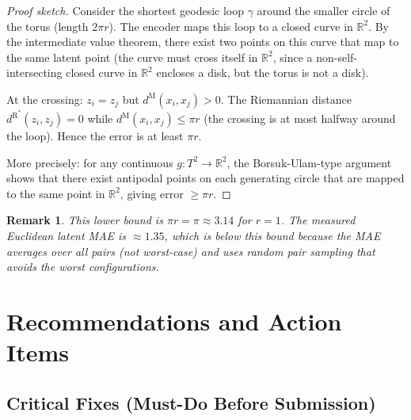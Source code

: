 \documentclass{article}
\newtheorem{remark}{Remark}
\newcommand{\dR}{d^{\mathrm{R}}}
\newcommand{\dM}{d^{\mathrm{M}}}
\newcommand{\RR}{\mathbb{R}}
\begin{document}
\begin{proof}[Proof sketch]
Consider the shortest geodesic loop $\gamma$ around the smaller circle of the
torus (length $2\pi r$). The encoder maps this loop to a closed curve in
$\RR^2$. By the intermediate value theorem, there exist two points on this
curve that map to the same latent point (the curve must cross itself in
$\RR^2$, since a non-self-intersecting closed curve in $\RR^2$ encloses a
disk, but the torus is not a disk).

At the crossing: $z_i = z_j$ but $\dM(x_i, x_j) > 0$. The Riemannian
distance $\dR^*(z_i, z_j) = 0$ while $\dM(x_i, x_j) \leq \pi r$ (the
crossing is at most halfway around the loop). Hence the error is at least
$\pi r$.

More precisely: for any continuous $g: T^2 \to \RR^2$, the Borsuk-Ulam-type
argument shows that there exist antipodal points on each generating circle
that are mapped to the same point in $\RR^2$, giving error $\geq \pi r$.
\end{proof}

\begin{remark}
This lower bound is $\pi r = \pi \approx 3.14$ for $r=1$. The measured
Euclidean latent MAE is $\approx 1.35$, which is below this bound because
the MAE averages over all pairs (not worst-case) and uses random pair
sampling that avoids the worst configurations.
\end{remark}


\section{Recommendations and Action Items}
\label{sec:recommendations}

\subsection{Critical Fixes (Must-Do Before Submission)}
\end{document}
